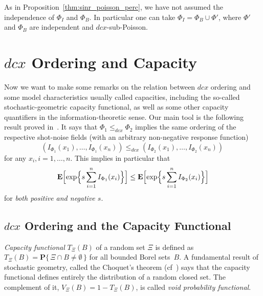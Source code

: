 \documentclass[conference]{IEEEtran}
\begin{document}
As in Proposition~\ref{thm:sinr_poisson_perc}, we have not assumed the
independence of $\Phi_I$ and $\Phi_B$. In particular  one can take
$\Phi_I = \Phi_B \cup \Phi'$,
where $\Phi'$ and $\Phi_B$ are independent and $dcx$-sub-Poisson. 

\section{$dcx$  Ordering and Capacity}
\label{s.Capacity}
Now we want to make some remarks  on the relation between $dcx$
ordering and some model characteristics 
usually called  capacities, including  the so-called
stochastic-geometric capacity
functional, as well as
some other capacity quantifiers in the information-theoretic  sense.
Our main tool is the following result 
proved in~\cite[Theorem 2.1]{snorder}. It  says that
 $\Phi_1\leq_{dcx}\Phi_2$
implies the same ordering of the respective shot-noise fields 
(with an arbitrary non-negative response function) 
\begin{equation}\label{e.shot-noise-dcx}
(I_{\Phi_1}(x_1),\ldots, I_{\Phi_1}(x_n))\le_{dcx}
(I_{\Phi_2}(x_1),\ldots, I_{\Phi_2}(x_n))\,
\end{equation}
for any $x_i, i=1,\ldots,n$.
This implies in particular that 
\begin{equation}
\label{e.shot-noise-LT}
{{\mathbf E}}\Bigl[\exp\Bigl\{s\sum_{i=1}^nI_{\Phi_1}(x_i)\Bigr\}\Bigr]\le
{{\mathbf E}}\Bigl[\exp\Bigl\{s\sum_{i=1}^nI_{\Phi_2}(x_i)\Bigr\}\Bigr]
\end{equation}
for {\em both positive and negative $s$}.

\subsection{$dcx$ Ordering and  the Capacity Functional}
\label{ss.SGcapacity}
{\em Capacity functional} $T_\Xi(B)$ of a random set $\Xi$
is defined as $T_{\Xi}(B)={{\mathbf P}}\{\,\Xi\cap B\not=\emptyset\,\}$ for all  bounded
Borel  sets~$B$. A fundamental result of stochastic geometry, called 
the Choquet's theorem (cf~\cite{Matheron75})  
says that the capacity functional defines entirely the
distribution of a random closed set. The complement of it,
$V_\Xi(B)=1-T_\Xi(B)$, is called {\em void probability functional}.
 
\end{document}
